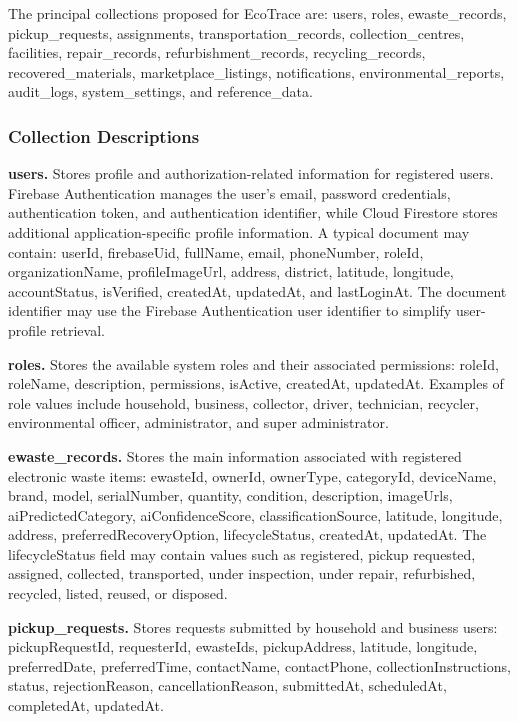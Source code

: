 The principal collections proposed for EcoTrace are: users, roles,
ewaste\_records, pickup\_requests, assignments, transportation\_records,
collection\_centres, facilities, repair\_records, refurbishment\_records,
recycling\_records, recovered\_materials, marketplace\_listings, notifications,
environmental\_reports, audit\_logs, system\_settings, and reference\_data.

\subsubsection{Collection Descriptions}

\textbf{users.} Stores profile and authorization-related information for
registered users. Firebase Authentication manages the user's email, password
credentials, authentication token, and authentication identifier, while Cloud
Firestore stores additional application-specific profile information. A typical
document may contain: userId, firebaseUid, fullName, email, phoneNumber,
roleId, organizationName, profileImageUrl, address, district, latitude,
longitude, accountStatus, isVerified, createdAt, updatedAt, and lastLoginAt.
The document identifier may use the Firebase Authentication user identifier
to simplify user-profile retrieval.

\textbf{roles.} Stores the available system roles and their associated
permissions: roleId, roleName, description, permissions, isActive, createdAt,
updatedAt. Examples of role values include household, business, collector,
driver, technician, recycler, environmental officer, administrator, and super
administrator.

\textbf{ewaste\_records.} Stores the main information associated with
registered electronic waste items: ewasteId, ownerId, ownerType, categoryId,
deviceName, brand, model, serialNumber, quantity, condition, description,
imageUrls, aiPredictedCategory, aiConfidenceScore, classificationSource,
latitude, longitude, address, preferredRecoveryOption, lifecycleStatus,
createdAt, updatedAt. The lifecycleStatus field may contain values such as
registered, pickup requested, assigned, collected, transported, under
inspection, under repair, refurbished, recycled, listed, reused, or disposed.

\textbf{pickup\_requests.} Stores requests submitted by household and
business users: pickupRequestId, requesterId, ewasteIds, pickupAddress,
latitude, longitude, preferredDate, preferredTime, contactName, contactPhone,
collectionInstructions, status, rejectionReason, cancellationReason,
submittedAt, scheduledAt, completedAt, updatedAt.


